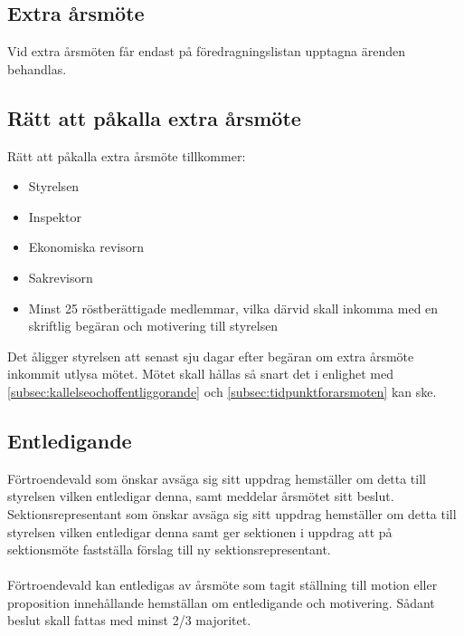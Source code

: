         \subsection{Extra årsmöte}
        \label{subsec:extraarsmote}
                Vid extra årsmöten får endast på föredragningslistan upptagna ärenden behandlas.

        \subsection{Rätt att påkalla extra årsmöte}
        \label{subsec:rattattpakallaextraarsmote}
                Rätt att påkalla extra årsmöte tillkommer:
                \begin{itemize}
                \setlength{\itemsep}{0.0cm}
                \setlength{\parskip}{0.0cm}
                        \item Styrelsen
                        \item Inspektor
                        \item Ekonomiska revisorn
                        \item Sakrevisorn
                        \item Minst 25 röstberättigade medlemmar, vilka därvid skall inkomma med en skriftlig begäran och motivering till styrelsen
                \end{itemize}

        Det åligger styrelsen att senast sju dagar efter begäran om extra årsmöte inkommit utlysa mötet. Mötet skall hållas så snart det i enlighet med \ref{subsec:kallelseochoffentliggorande} och \ref{subsec:tidpunktforarsmoten} kan ske.

\clearpage
        \subsection{Entledigande}
        \label{subsec:entledigande}
                Förtroendevald som önskar avsäga sig sitt uppdrag hemställer om detta till styrelsen vilken entledigar denna, samt meddelar årsmötet sitt beslut. Sektionsrepresentant som önskar avsäga sig sitt uppdrag hemställer om detta till styrelsen vilken entledigar denna samt ger sektionen i uppdrag att på sektionsmöte fastställa förslag till ny sektionsrepresentant.\\ \\
                Förtroendevald kan entledigas av årsmöte som tagit ställning till motion eller proposition innehållande hemställan om entledigande och motivering. Sådant beslut skall fattas med minst 2/3 majoritet.

